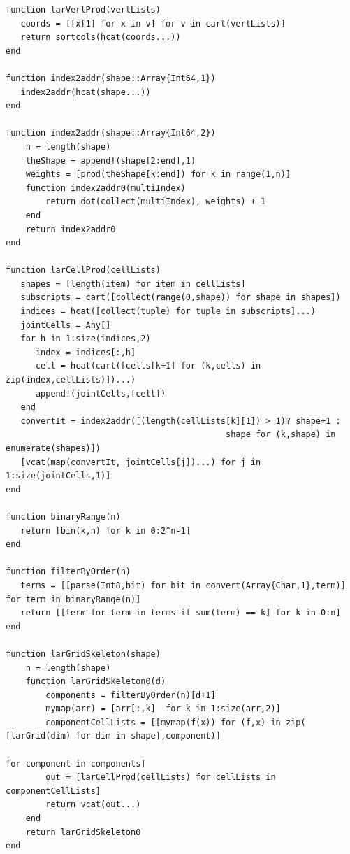 \documentclass{article}
\begin{document}
\begin{flushleft}
\begin{list}{}{}
\begin{Verbatim}[tabsize=4]
function larVertProd(vertLists)
   coords = [[x[1] for x in v] for v in cart(vertLists)]
   return sortcols(hcat(coords...))
end

function index2addr(shape::Array{Int64,1})
   index2addr(hcat(shape...))
end

function index2addr(shape::Array{Int64,2})
    n = length(shape)
    theShape = append!(shape[2:end],1)
    weights = [prod(theShape[k:end]) for k in range(1,n)]
    function index2addr0(multiIndex)
        return dot(collect(multiIndex), weights) + 1
    end
    return index2addr0
end

function larCellProd(cellLists)
   shapes = [length(item) for item in cellLists]
   subscripts = cart([collect(range(0,shape)) for shape in shapes])
   indices = hcat([collect(tuple) for tuple in subscripts]...)
   jointCells = Any[]
   for h in 1:size(indices,2)
      index = indices[:,h]
      cell = hcat(cart([cells[k+1] for (k,cells) in zip(index,cellLists)])...)
      append!(jointCells,[cell])
   end
   convertIt = index2addr([(length(cellLists[k][1]) > 1)? shape+1 :
                                            shape for (k,shape) in enumerate(shapes)])
   [vcat(map(convertIt, jointCells[j])...) for j in 1:size(jointCells,1)]
end

function binaryRange(n)
   return [bin(k,n) for k in 0:2^n-1]
end

function filterByOrder(n)
   terms = [[parse(Int8,bit) for bit in convert(Array{Char,1},term)] for term in binaryRange(n)]
   return [[term for term in terms if sum(term) == k] for k in 0:n]
end

function larGridSkeleton(shape)
    n = length(shape)
    function larGridSkeleton0(d)
        components = filterByOrder(n)[d+1]
        mymap(arr) = [arr[:,k]  for k in 1:size(arr,2)] 
        componentCellLists = [[mymap(f(x)) for (f,x) in zip( [larGrid(dim) for dim in shape],component)]
                                                                            for component in components]
        out = [larCellProd(cellLists) for cellLists in componentCellLists]
        return vcat(out...)
    end
    return larGridSkeleton0
end
\end{Verbatim}
\end{list}
\end{flushleft}

\vspace{2ex}
\end{document}
